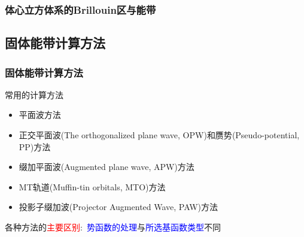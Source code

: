 \frame
{
	\frametitle{体心立方体系的\textrm{Brillouin}区与能带}
\vspace{10pt}
\begin{figure}[h!]
\centering
\hspace*{-0.30in}
\label{Band_Gap_BCC_GeF4}
\end{figure}
}

\subsection{固体能带计算方法}
\frame
{
\frametitle{固体能带计算方法}
\vskip 10pt
常用的计算方法
\begin{itemize}%
\setlength{\itemsep}{12pt}
	\item	平面波方法
	\item	正交平面波\textrm{(The orthogonalized plane wave, OPW)}和赝势\textrm{(Pseudo-potential, PP)}方法
	\item	缀加平面波\textrm{(Augmented plane wave, APW)}方法
	\item	\textrm{MT}轨道\textrm{(Muffin-tin orbitals, MTO)}方法
	\item	投影子缀加波\textrm{(Projector Augmented Wave, PAW)}方法
\end{itemize}
\vskip 5pt 各种方法的\textcolor{red}{主要区别}:~\textcolor{blue}{势函数的处理}与\textcolor{blue}{所选基函数类型}不同
}

